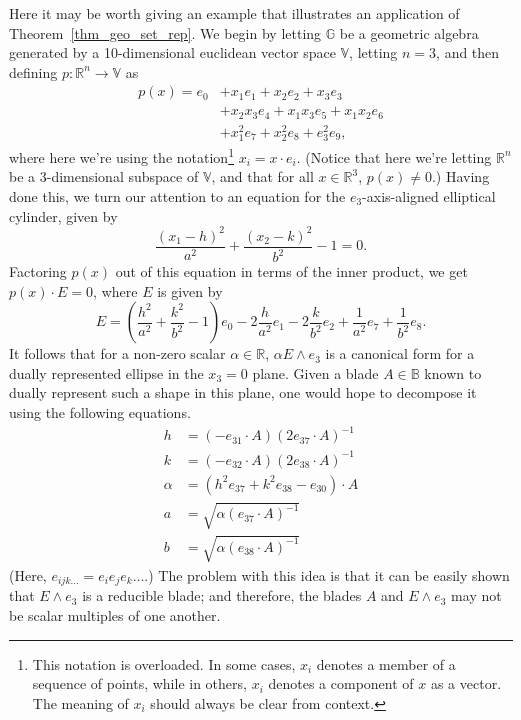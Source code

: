 \documentclass{birkjour}
\theoremstyle{definition}
\theoremstyle{remark}
\numberwithin{equation}{section}
\newcommand{\R}{\mathbb{R}}
\newcommand{\B}{\mathbb{B}}
\newcommand{\G}{\mathbb{G}}
\newcommand{\V}{\mathbb{V}}
\begin{document}
Here it may be worth giving an example that illustrates an application of Theorem~\ref{thm_geo_set_rep}.
We begin by letting $\G$ be a geometric algebra generated by a 10-dimensional euclidean vector space $\V$, letting $n=3$, and then defining
$p:\R^n\to\V$ as
\begin{align}
p(x) = e_0
 &+ x_1e_1 + x_2e_2 + x_3e_3 \nonumber\\
 &+ x_2x_3e_4 + x_1x_3e_5 + x_1x_2e_6 \nonumber\\
 &+ x_1^2e_7 + x_2^2e_8 + e_3^2e_9,
\end{align}
where here we're using the notation\footnote{This notation is overloaded.  In some cases, $x_i$ denotes a member
of a sequence of points, while in others, $x_i$ denotes a component of $x$ as a vector.  The meaning of $x_i$ should
always be clear from context.} $x_i=x\cdot e_i$.  (Notice that here we're letting $\R^n$ be
a 3-dimensional subspace of $\V$, and that for all $x\in\R^3$, $p(x)\neq 0$.)  Having done this,
we turn our attention to an equation for the $e_3$-axis-aligned elliptical cylinder, given by
\begin{equation}
\frac{(x_1-h)^2}{a^2}+\frac{(x_2-k)^2}{b^2}-1=0.
\end{equation}
Factoring $p(x)$ out of this equation in terms of the inner product, we get $p(x)\cdot E=0$,
where $E$ is given by
\begin{equation}
E = \left(\frac{h^2}{a^2}+\frac{k^2}{b^2}-1\right)e_0-2\frac{h}{a^2}e_1-2\frac{k}{b^2}e_2+\frac{1}{a^2}e_7+\frac{1}{b^2}e_8.
\end{equation}
It follows that for a non-zero scalar $\alpha\in\R$, $\alpha E\wedge e_3$ is a canonical form for a dually represented ellipse in the $x_3=0$ plane.
Given a blade $A\in\B$ known to dually represent such a shape in this plane, one would hope to decompose it using the following equations.
\begin{align}
h &= (-e_{31}\cdot A)(2e_{37}\cdot A)^{-1}\label{equ_decompose_first} \\
k &= (-e_{32}\cdot A)(2e_{38}\cdot A)^{-1} \\
\alpha &= (h^2e_{37}+k^2e_{38}-e_{30})\cdot A \\
a &= \sqrt{\alpha(e_{37}\cdot A)^{-1}} \\
b &= \sqrt{\alpha(e_{38}\cdot A)^{-1}}\label{equ_decompose_last}
\end{align}
(Here, $e_{ijk\dots}=e_ie_je_k\dots$.)
The problem with this idea is that it can be easily shown that $E\wedge e_3$ is a reducible blade; and therefore,
the blades $A$ and $E\wedge e_3$ may not be scalar multiples of one another.
\end{document}
